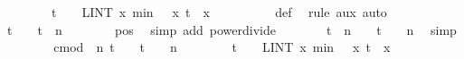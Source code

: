 \documentclass{svjour3}
\begin{document}
{\begin{isabellebody}
\ \ \ \ \ \ \ \ {\isacharquery}t\ {\isacharslash}\ {}\ {\isacharasterisk}\ {\isacharparenleft}LINT\ x{\isacharbar}{\isasymmu}{\isachardot}\ min\ {\isacharparenleft}{}\ {\isacharasterisk}\ x\ {\isacharparenleft}{\isasymbar}{\isacharquery}t{\isasymbar}\ {\isacharasterisk}\ {\isasymbar}x{\isasymbar}\ {\isacharcircum}\ {}{\isacharparenright}{\isacharparenright}{\isachardoublequoteclose}\isanewline
\ \ \ \ \ \ \isamarkupfalse%
\ {\isasympsi}{\isacharunderscore}def\ \isamarkupfalse%
\ {\isacharparenleft}rule\ {\isasymmu}{\isachardot}aux{\isacharcomma}\ auto{\isacharparenright}\isanewline
\ \ \ \ \isamarkupfalse%
\ \isamarkupfalse%
\ {\isachardoublequoteopen}{\isacharquery}t{\isacharcircum}{}\ {\isacharasterisk}\ {\isasymsigma}\ {\isacharequal}\ t{\isacharcircum}{}\ {\isacharslash}\ n{\isachardoublequoteclose}\isanewline
\ \ \ \ \ \ \isamarkupfalse%
\ {\isasymsigma}{\isacharunderscore}pos\ \isamarkupfalse%
\ {\isacharparenleft}simp\ add{\isacharcolon}\ power{\isacharunderscore}divide{\isacharparenright}\isanewline
\ \ \ \ \isamarkupfalse%
\ \isamarkupfalse%
\ {\isachardoublequoteopen}t{\isacharcircum}{}\ {\isacharslash}\ n\ {\isacharslash}\ {}\ {\isacharequal}\ {\isacharparenleft}t{\isacharcircum}{}\ {\isacharslash}\ {}{\isacharparenright}\ {\isacharslash}\ n{\isachardoublequoteclose}\ \isamarkupfalse%
\ simp\isanewline
\ \ \ \ \isamarkupfalse%
\ \isamarkupfalse%
\ {\isacharasterisk}{\isacharasterisk}{\isacharcolon}\ {\isachardoublequoteopen}cmod\ {\isacharparenleft}{\isasympsi}\ n\ t\ {\isacharminus}\ {\isacharparenleft}{}\ {\isacharplus}\ {\isacharparenleft}{\isacharminus}{\isacharparenleft}t{\isacharcircum}{}{\isacharparenright}\ {\isacharslash}\ {}{\isacharparenright}\ {\isacharslash}\ n{\isacharparenright}{\isacharparenright}\ {\isasymle}\ \isanewline
\ \ \ \ \ \ {\isacharquery}t\ {\isacharslash}\ {}\ {\isacharasterisk}\ {\isacharparenleft}LINT\ x{\isacharbar}{\isasymmu}{\isachardot}\ min\ {\isacharparenleft}{}\ {\isacharasterisk}\ x\ {\isacharparenleft}{\isasymbar}{\isacharquery}t{\isasymbar}\ {\isacharasterisk}\ {\isasymbar}x{\isasymbar}\ {\isacharcircum}\ {}{\isacharparenright}{\isacharparenright}{\isachardoublequoteclose}\ \isamarkupfalse%

\end{isabellebody}}
\end{document}
